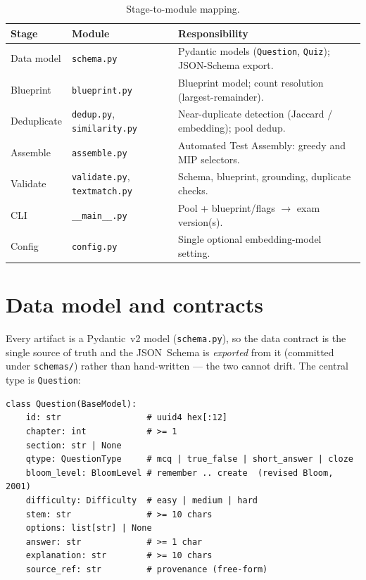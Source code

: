 \documentclass[11pt,a4paper]{article}
\newcommand{\code}[1]{\texttt{\small #1}}
\newcommand{\pkg}[1]{\texttt{\small #1}}
\begin{document}
\begin{table}[h]
\centering
\caption{Stage-to-module mapping.}
\label{tab:modules}
\small
\begin{tabular}{@{}llp{7.4cm}@{}}
\toprule
\textbf{Stage} & \textbf{Module} & \textbf{Responsibility} \\
\midrule
Data model    & \pkg{schema.py}    & Pydantic models (\code{Question}, \code{Quiz}); JSON-Schema export. \\
Blueprint     & \pkg{blueprint.py} & Blueprint model; count resolution (largest-remainder). \\
Deduplicate   & \pkg{dedup.py}, \pkg{similarity.py} & Near-duplicate detection (Jaccard / embedding); pool dedup. \\
Assemble      & \pkg{assemble.py}  & Automated Test Assembly: greedy and MIP selectors. \\
Validate      & \pkg{validate.py}, \pkg{textmatch.py} & Schema, blueprint, grounding, duplicate checks. \\
CLI           & \pkg{\_\_main\_\_.py} & Pool + blueprint/flags $\to$ exam version(s). \\
Config        & \pkg{config.py}    & Single optional embedding-model setting. \\
\bottomrule
\end{tabular}
\end{table}

\section{Data model and contracts}
\label{sec:schema}

Every artifact is a Pydantic~v2 model (\pkg{schema.py}), so the data contract
is the single source of truth and the JSON~Schema is \emph{exported} from it
(committed under \code{schemas/}) rather than hand-written --- the two cannot
drift. The central type is \code{Question}:

\begin{lstlisting}
class Question(BaseModel):
    id: str                 # uuid4 hex[:12]
    chapter: int            # >= 1
    section: str | None
    qtype: QuestionType     # mcq | true_false | short_answer | cloze
    bloom_level: BloomLevel # remember .. create  (revised Bloom, 2001)
    difficulty: Difficulty  # easy | medium | hard
    stem: str               # >= 10 chars
    options: list[str] | None
    answer: str             # >= 1 char
    explanation: str        # >= 10 chars
    source_ref: str         # provenance (free-form)
\end{lstlisting}
\end{document}
